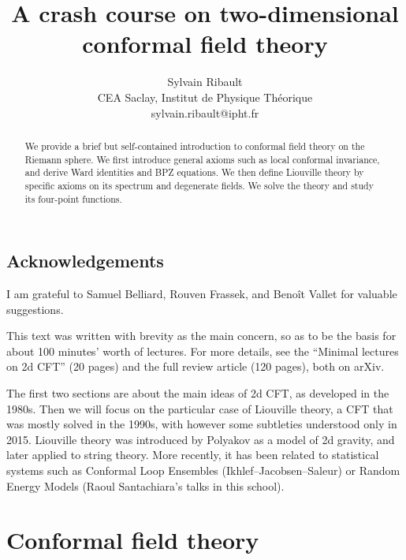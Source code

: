 \documentclass[12pt, a4paper]{article}
\title{\bfseries A crash course on two-dimensional \\ conformal field theory}
\author{Sylvain Ribault \vspace{2mm}
\\
{\normalsize CEA Saclay, Institut de Physique Th\'eorique}
 \\
 {\footnotesize \ttfamily sylvain.ribault@ipht.fr }
}
\theoremstyle{break}
\begin{document}
\maketitle


\begin{abstract}
We provide a brief but self-contained introduction to conformal field theory on the Riemann sphere. We first introduce general axioms such as local conformal invariance, and derive Ward identities and BPZ equations. We then define Liouville theory by specific axioms on its spectrum and degenerate fields. We solve the theory and study its four-point functions.
\end{abstract}

\tableofcontents




\subsection*{Acknowledgements}

I am grateful to Samuel Belliard, Rouven Frassek, and Beno\^it Vallet for valuable suggestions.

\clearpage

\hypersetup{linkcolor=blue}



This text was written with brevity as the main concern, so as to be the basis for about 100 minutes' worth of lectures. For more details, see the ``Minimal lectures on 2d CFT'' \cite{rib16} (20 pages) and the full review article \cite{rib14} (120 pages), both on arXiv.

The first two sections are about the main ideas of 2d CFT, as developed in the 1980s. Then we will focus on the particular case of Liouville theory, a CFT that was mostly solved in the 1990s, with however some subtleties understood only in 2015. Liouville theory was introduced by Polyakov as a model of 2d gravity, and later applied to string theory. More recently, it has been related to statistical systems such as Conformal Loop Ensembles (Ikhlef--Jacobsen--Saleur) or Random Energy Models (Raoul Santachiara's talks in this school).

\section{Conformal field theory}
\end{document}
